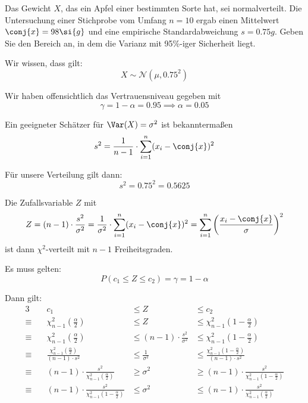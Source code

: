 \documentclass{abgabe}
\begin{document}
\begin{questions}
    \question
    Das Gewicht $X$, das ein Apfel einer bestimmten Sorte hat, sei normalverteilt.
    Die Untersuchung einer Stichprobe vom Umfang $n = 10$ ergab einen Mittelwert $\conj{x} = 98 \si{g}$ und eine empirische Standardabweichung $s = 0.75 \si{g}$.
    Geben Sie den Bereich an, in dem die Varianz mit 95\%-iger Sicherheit liegt.
    \begin{solution}
        Wir wissen, dass gilt:
        \[
            X \sim \mathcal{N}(\mu, 0.75^2)
        \]

        Wir haben offensichtlich das Vertrauensniveau gegeben mit
        \[
            \gamma = 1 - \alpha = 0.95 \implies \alpha = 0.05
        \]

        Ein geeigneter Schätzer für $\Var(X) = \sigma^2$ ist bekanntermaßen
        \[
            s^2 = \frac{1}{n-1} \cdot \sum_{i=1}^{n} (x_i - \conj{x})^2
        \]

        Für unsere Verteilung gilt dann:
        \[
            s^2 = 0.75^2 = 0.5625
        \]

        Die Zufallsvariable $Z$ mit
        \[
            Z = (n-1) \cdot \frac{s^2}{\sigma^2} = \frac{1}{\sigma^2} \cdot \sum_{i=1}^{n} (x_i - \conj{x})^2 = \sum_{i=1}^{n} \left(\frac{x_i - \conj{x}}{\sigma}\right)^2
        \]
        ist dann $\chi^2$-verteilt mit $n-1$ Freiheitsgraden.

        Es muss gelten:
        \[
            P(c_1 \leq Z \leq c_2) = \gamma = 1 - \alpha
        \]

        Dann gilt:
        \begin{alignat*}{3}
                         & c_1                                                                      & \leq Z                                & \leq c_2                                                                     \\
            \equiv \quad & \chi^2_{n-1} \left( \frac{\alpha}{2} \right)                             & \leq Z                                & \leq \chi^2_{n-1} \left(1 - \frac{\alpha}{2} \right)                         \\
            \equiv \quad & \chi^2_{n-1} \left( \frac{\alpha}{2} \right)                             & \leq (n-1) \cdot \frac{s^2}{\sigma^2} & \leq \chi^2_{n-1} \left(1 - \frac{\alpha}{2} \right)                         \\
            \equiv \quad & \frac{\chi^2_{n-1} \left( \frac{\alpha}{2} \right)}{(n-1) \cdot s^2}     & \leq \frac{1}{\sigma^2}               & \leq \frac{\chi^2_{n-1} \left(1 - \frac{\alpha}{2} \right)}{(n-1) \cdot s^2} \\
            \equiv \quad & (n-1) \cdot \frac{s^2}{\chi^2_{n-1} \left( \frac{\alpha}{2} \right)}     & \geq \sigma^2                         & \geq (n-1) \cdot \frac{s^2}{\chi^2_{n-1} \left(1 - \frac{\alpha}{2} \right)} \\
            \equiv \quad & (n-1) \cdot \frac{s^2}{\chi^2_{n-1} \left( 1 - \frac{\alpha}{2} \right)} & \leq \sigma^2                         & \leq (n-1) \cdot \frac{s^2}{\chi^2_{n-1} \left(\frac{\alpha}{2} \right)}
        \end{alignat*}


\end{solution}
\end{questions}
\end{document}
